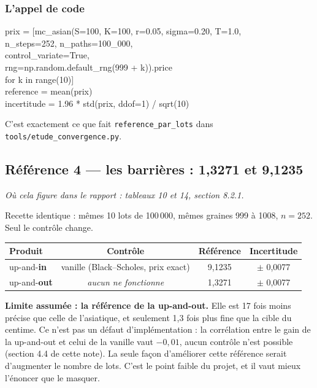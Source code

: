 \documentclass[11pt,a4paper]{article}
\newcommand{\ou}[1]{\textit{\small Où cela figure dans le rapport : #1}}
\begin{document}
\subsubsection*{L'appel de code}

\begin{center}\small
\begin{minipage}{0.93\linewidth}
\ttfamily\footnotesize
prix = [mc\_asian(S=100, K=100, r=0.05, sigma=0.20, T=1.0,\\
\phantom{prix = [mc\_asian(}n\_steps=252, n\_paths=100\_000,\\
\phantom{prix = [mc\_asian(}control\_variate=True,\\
\phantom{prix = [mc\_asian(}rng=np.random.default\_rng(999 + k)).price\\
\phantom{prix = [}for k in range(10)]\\[3pt]
reference = mean(prix)\\
incertitude = 1.96 * std(prix, ddof=1) / sqrt(10)
\end{minipage}
\end{center}

C'est exactement ce que fait \texttt{reference\_par\_lots} dans
\texttt{tools/etude\_convergence.py}.

\subsection{Référence 4 --- les barrières : 1,3271 et 9,1235}

\ou{tableaux 10 et 14, section 8.2.1.}

Recette identique : mêmes 10 lots de 100\,000, mêmes graines 999 à 1008,
$n = 252$. Seul le contrôle change.

\begin{center}
\small
\begin{tabular}{lccc}
\toprule
Produit & Contrôle & Référence & Incertitude \\
\midrule
up-and-\textbf{in}  & vanille (Black--Scholes, prix exact) & 9,1235 & $\pm$ 0,0077 \\
up-and-\textbf{out} & \emph{aucun ne fonctionne} & 1,3271 & $\pm$ 0,0077 \\
\bottomrule
\end{tabular}
\end{center}

\begin{choix}
\textbf{Limite assumée : la référence de la up-and-out.} Elle est 17 fois moins
précise que celle de l'asiatique, et seulement 1,3 fois plus fine que la cible
du centime. Ce n'est pas un défaut d'implémentation : la corrélation entre le
gain de la up-and-out et celui de la vanille vaut $-0{,}01$, aucun contrôle
n'est possible (section 4.4 de cette note). La seule façon d'améliorer cette
référence serait d'augmenter le nombre de lots. C'est le point faible du
projet, et il vaut mieux l'énoncer que le masquer.
\end{choix}
\end{document}
